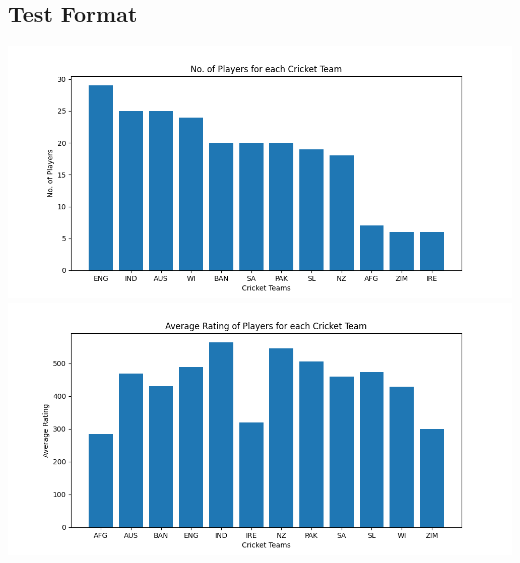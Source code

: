 \documentclass{article}
\begin{document}
\begin{normalsize}
            \subsection{Test Format}\label{subsec:test}
                \includegraphics[scale=0.7]{overall_test-1}
                \vspace{1em}\\
                \includegraphics[scale=0.7]{overall_test-2}
\end{normalsize}
\end{document}
